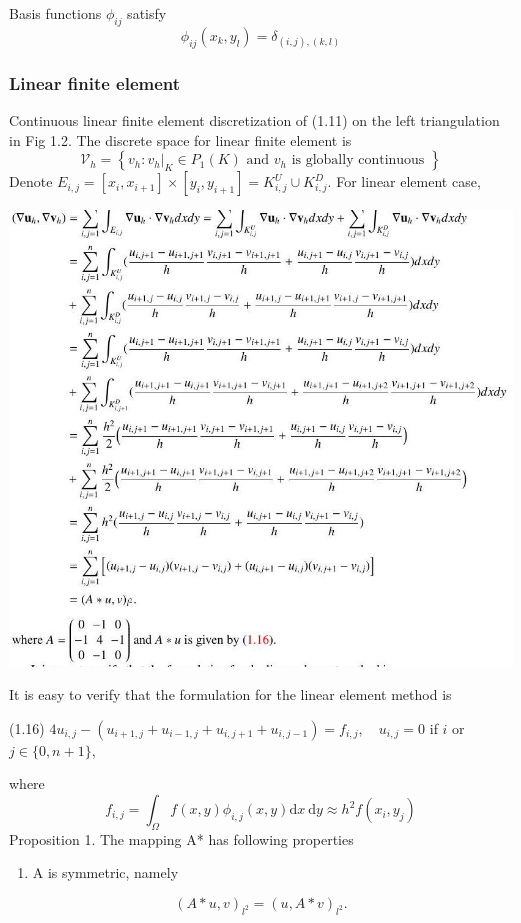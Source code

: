\documentclass[10pt]{article}
\begin{document}
Basis functions $\phi_{i j}$ satisfy
$$
\phi_{i j}\left(x_{k}, y_{l}\right)=\delta_{(i, j),(k, l)}
$$

\subsubsection{Linear finite element}
Continuous linear finite element discretization of (1.11) on the left triangulation in Fig 1.2. The discrete space for linear finite element is
$$
\mathcal{V}_{h}=\left\{v_{h}:\left.v_{h}\right|_{K} \in P_{1}(K) \text { and } v_{h} \text { is globally continuous }\right\}
$$
Denote $E_{i, j}=\left[x_{i}, x_{i+1}\right] \times\left[y_{i}, y_{i+1}\right]=K_{i, j}^{U} \cup K_{i, j}^{D} .$ For linear element case,

\includegraphics[max width=\textwidth]{2022_01_06_c2f144dbff0f0a17cc7dg-6}

It is easy to verify that the formulation for the linear element method is

(1.16) $4 u_{i, j}-\left(u_{i+1, j}+u_{i-1, j}+u_{i, j+1}+u_{i, j-1}\right)=f_{i, j}, \quad u_{i, j}=0$ if $i$ or $j \in\{0, n+1\}$,

where
$$
f_{i, j}=\int_{\Omega} f(x, y) \phi_{i, j}(x, y) \mathrm{d} x \mathrm{~d} y \approx h^{2} f\left(x_{i}, y_{j}\right)
$$
Proposition 1. The mapping A* has following properties

    \begin{enumerate}
      \item A is symmetric, namely
    \end{enumerate}
$$
(A * u, v)_{l^{2}}=(u, A * v)_{l^{2}} .
$$
\end{document}
